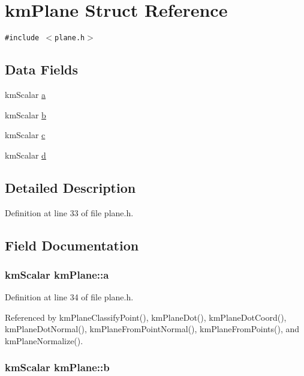 \hypertarget{structkm_plane}{
\section{kmPlane Struct Reference}
\label{structkm_plane}
}
{\tt \#include $<$plane.h$>$}

\subsection*{Data Fields}
\begin{CompactItemize}
\item 
kmScalar \hyperlink{structkm_plane_912b0822bfd525570a072d01b0c3b9e1}{a}
\item 
kmScalar \hyperlink{structkm_plane_c16b759b0f6973f00c2c742ec418e2d1}{b}
\item 
kmScalar \hyperlink{structkm_plane_46fb82aee3e4ccec7bb027ba53998600}{c}
\item 
kmScalar \hyperlink{structkm_plane_a3c74528242125229ab0038e9a09b803}{d}
\end{CompactItemize}


\subsection{Detailed Description}


Definition at line 33 of file plane.h.

\subsection{Field Documentation}
\hypertarget{structkm_plane_912b0822bfd525570a072d01b0c3b9e1}{
\subsubsection[{a}]{\setlength{\rightskip}{0pt plus 5cm}kmScalar {\bf kmPlane::a}}}
\label{structkm_plane_912b0822bfd525570a072d01b0c3b9e1}




Definition at line 34 of file plane.h.

Referenced by kmPlaneClassifyPoint(), kmPlaneDot(), kmPlaneDotCoord(), kmPlaneDotNormal(), kmPlaneFromPointNormal(), kmPlaneFromPoints(), and kmPlaneNormalize().\hypertarget{structkm_plane_c16b759b0f6973f00c2c742ec418e2d1}{
\subsubsection[{b}]{\setlength{\rightskip}{0pt plus 5cm}kmScalar {\bf kmPlane::b}}}
\label{structkm_plane_c16b759b0f6973f00c2c742ec418e2d1}




